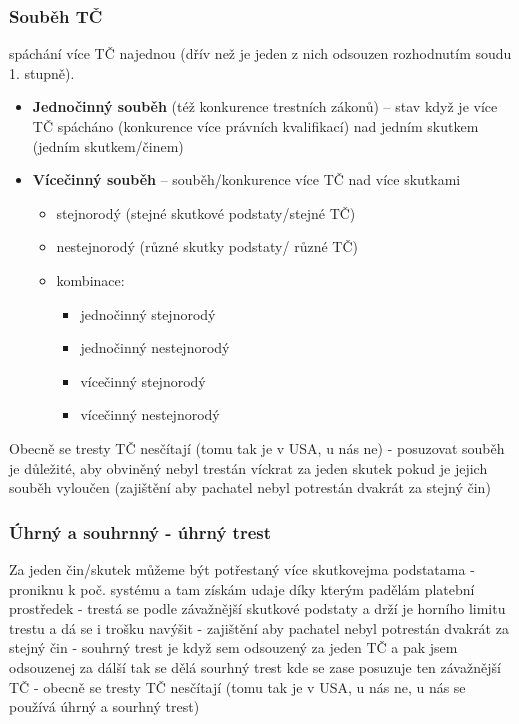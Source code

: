 \subsubsection{Souběh TČ}
spáchání více TČ najednou (dřív než je jeden z nich odsouzen rozhodnutím soudu 1.
stupně).
\begin{itemize}
    \item \textbf{Jednočinný souběh} (též konkurence trestních zákonů) -- stav když je více TČ spácháno
    (konkurence více právních kvalifikací) nad jedním skutkem (jedním skutkem/činem)
    \item \textbf{Vícečinný souběh} -- souběh/konkurence více TČ nad více skutkami
    \begin{itemize}
        \item stejnorodý (stejné skutkové podstaty/stejné TČ)
        \item nestejnorodý (různé skutky podstaty/ různé TČ)
        \item kombinace:
        \begin{itemize}
            \item jednočinný stejnorodý
            \item jednočinný nestejnorodý
            \item vícečinný stejnorodý
            \item vícečinný nestejnorodý
        \end{itemize}
    \end{itemize}
\end{itemize}
Obecně se tresty TČ nesčítají (tomu tak je v USA, u nás ne) - posuzovat souběh je důležité, aby obviněný nebyl
trestán víckrat za jeden skutek pokud je jejich souběh vyloučen (zajištění aby pachatel nebyl potrestán dvakrát za stejný čin)

\subsubsection{Úhrný a souhrnný - úhrný trest}
Za jeden čin/skutek můžeme být potřestaný více skutkovejma podstatama - proniknu k poč. systému a tam získám udaje díky kterým padělám platební prostředek - trestá se podle závažnější skutkové podstaty a drží je horního limitu trestu a
dá se i trošku navýšit - zajištění aby pachatel nebyl potrestán dvakrát za stejný čin - souhrný trest
je když sem odsouzený za jeden TČ a pak jsem odsouzenej za dálší tak se dělá sourhný trest kde
se zase posuzuje ten závažnější TČ - obecně se tresty TČ nesčítají (tomu tak je v USA, u nás ne, u
nás se používá úhrný a sourhný trest)

